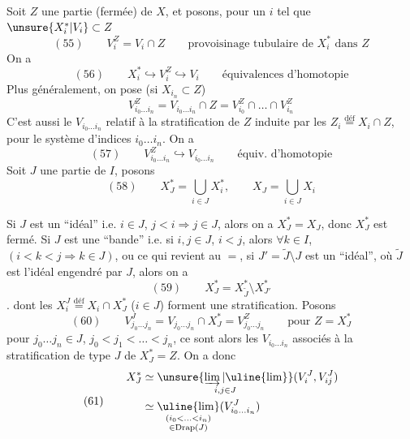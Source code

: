 Soit $Z$  une partie (fermée)
de $X$, et posons, pour \deleted{$\unsure{\forall}$} un $i$ tel que
$\unsure{X_i^*|V_i}\subset Z$
\[
(55)\qquad V_i^Z=V_i\cap Z\qquad
\text{provoisinage tubulaire de }X_i^*\text{ dans }Z
\]
On a
\[
(56)\qquad X_i^*\hookrightarrow V_i^Z\hookrightarrow V_i
\qquad\text{équivalences d'homotopie}
\]
Plus généralement, on pose (si $X_{i_n}\subset Z$)
\[
V_{i_0\ldots i_n}^Z=V_{i_0\ldots i_n}\cap Z
=V_{i_0}^Z\cap\ldots\cap V_{i_n}^Z
\]
C'est aussi le $V_{i_0\ldots i_n}$ relatif à la 
stratification de $Z$ induite par les
$Z_i\overset{\mathrm{déf}}{=}X_i\cap Z$, pour le système d'indices
$i_0\ldots i_n$. On a
\[
(57)\qquad V_{i_0\ldots i_n}^Z\hookrightarrow V_{i_0\ldots i_n}
\qquad\text{équiv. d'homotopie}
\]
Soit $J$ une partie de $I$, posons
\[
(58)\qquad X_J^*=\bigcup_{i\in J}X_i^*,\qquad X_J=\bigcup_{i\in J}X_i
\]

Si $J$ est un ``idéal'' i.e. $i\in J$, $j<i\Longrightarrow j\in J$,
alors on a $X_J^*=X_J$, donc $X_J^*$ est fermé.
Si $J$ est une ``bande'' i.e. si $i,j\in J$, $i<j$,
alors $\forall k\in I$, $(i<k<j\Longrightarrow k\in J)$,
ou ce qui revient au $=$, si $J'=\widetilde J\setminus J$ est
un ``idéal'', où $\widetilde J$ est l'idéal engendré par $J$,
alors on a
\[
(59)\qquad X_J^*=X_{\widetilde J}^*\setminus X_{J'}^*
\]
.
dont les $X_i^J\overset{\mathrm{déf}}{=}X_i\cap X_J^*$ ($i\in J$)
forment une stratification. Posons
\[
(60)\qquad V_{j_0\ldots j_n}^J
=V_{j_0\ldots j_n}\cap X_J^*=V_{j_0\ldots j_n}^Z
\qquad\text{pour }Z=X_J^*
\]
pour $j_0\ldots j_n\in J$, $j_0<j_1<\ldots<j_n$,
ce sont alors les $V_{i_0\ldots i_n}$ associés à la stratification
de type $J$ de $X_J^*=Z$. On a donc
\[
(61)\qquad\begin{aligned}
X_J^*&\simeq\underset{i,j\in J}{\unsure{\varinjlim|\uline{\lim}}}
(V_i^J,V_{ij}^J)\\
&\simeq\underset{\substack{(i_0<\ldots<i_n)\\\in\operatorname{Drap}(J)}}{\uline{\lim}}
(V_{i_0\ldots i_n}^J)
\end{aligned}
\]


